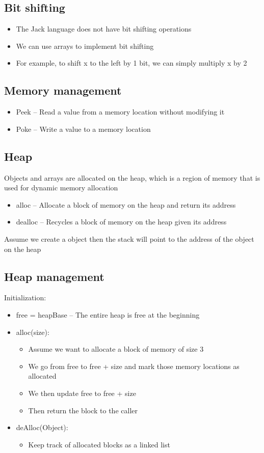 \documentclass[12pt,a4paper]{article}
\begin{document}
\subsection{Bit shifting}
\begin{itemize}
    \item The Jack language does not have bit shifting operations
    \item We can use arrays to implement bit shifting
    \item For example, to shift x to the left by 1 bit, we can simply multiply x by 2
\end{itemize}

\subsection{Memory management}
\begin{itemize}
    \item Peek -- Read a value from a memory location without modifying it
    \item Poke -- Write a value to a memory location
\end{itemize}

\subsection{Heap}
Objects and arrays are allocated on the heap, which is a region of memory that is used for dynamic memory allocation
\begin{itemize}
    \item alloc -- Allocate a block of memory on the heap and return its address
    \item dealloc -- Recycles a block of memory on the heap given its address
\end{itemize}
Assume we create a object then the stack will point to the address of the object on the heap

\subsection{Heap management}
Initialization:
\begin{itemize}
    \item free = heapBase -- The entire heap is free at the beginning
    \item alloc(size):
    \begin{itemize}
        \item Assume we want to allocate a block of memory of size 3
        \item We go from free to free + size and mark those memory locations as allocated
        \item We then update free to free + size
        \item Then return the block to the caller
    \end{itemize}
    \item deAlloc(Object): 
    \begin{itemize}
        \item Keep track of allocated blocks as a linked list
    \end{itemize}
\end{itemize}
\end{document}
